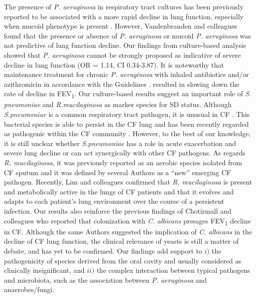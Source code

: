 The presence of \textit{P. aeruginosa} in respiratory tract cultures has been previously reported to be associated with a more rapid decline in lung function, especially when mucoid phenotype is present \cite{emerson2002pseudomonas}. However, Vandenbranden and colleagues \cite{vandenbranden2012lung} found that the presence or absence of \textit{P. aeruginosa} or mucoid \textit{P. aeruginosa} was not predictive of lung function decline. Our findings from culture-based analysis showed that \textit{P. aeruginosa} cannot be strongly proposed as indicative of severe decline in lung function (OR = 1.14, CI 0.34-3.87). It is noteworthy that maintenance treatment for chronic \textit{P. aeruginosa} with inhaled antibiotics and/or azithromicin in accordance with the Guidelines \cite{farrell2008guidelines}. resulted in slowing down the rate of decline in FEV\textsubscript{1}. Our culture-based results suggest an important role of \textit{S. pneumoniae} and \textit{R.mucilaginosa} as marker species for SD status. Although \textit{S.pneumoniae} is a common respiratory tract pathogen, it is unusual in CF \cite{foweraker2009recent}. This bacterial species is able to persist in the CF lung and has been recently regarded as pathogenic within the CF community \cite{maeda2011population}. However, to the best of our knowledge, it is still unclear whether \textit{S.pneumoniae} has a role in acute exacerbation and severe lung decline or can act synergically with other CF pathogens. As regards \textit{R. mucilaginosa}, it was previously reported as an aerobic species isolated from CF sputum \cite{tunney2008detection} and it was defined by several Authors \cite{bittar2008molecular} as a ``new'' emerging CF pathogen. Recently, Lim and colleagues \cite{lim2013mechanistic} confirmed that \textit{R. mucilaginosa} is present and metabolically active in the lungs of CF patients and that it evolves and adapts to each patient's lung environment over the course of a persistent infection. Our results also reinforce the previous findings of Chotirmall and colleagues \cite{chotirmall2010sputum} who reported that colonization with \textit{C. albicans} presages FEV\textsubscript{1} decline in CF. Although the same Authors suggested the implication of \textit{C. albicans} in the decline of CF lung function, the clinical relevance of yeasts is still a matter of debate, and has yet to be confirmed. Our findings add support to $i)$ the pathogenicity of species derived from the oral cavity and usually considered as clinically insignificant, and $ii)$ the complex interaction between typical pathogens and microbiota, such as the association between \textit{P. aeruginosa} and anaerobes/fungi.\\
